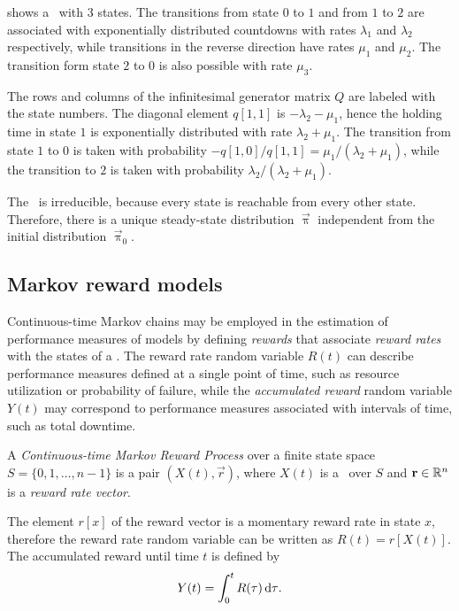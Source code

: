 \begin{example}
   shows a \CTMC\ with $3$
  states. The transitions from state $0$ to $1$ and from $1$ to $2$
  are associated with exponentially distributed countdowns with rates
  $\lambda_1$ and $\lambda_2$ respectively, while transitions in the
  reverse direction have rates $\mu_1$ and $\mu_2$. The transition
  form state $2$ to $0$ is also possible with rate $\mu_3$.
  
  The rows  and
  columns  of the infinitesimal generator
  matrix $Q$ are labeled with the state numbers. The diagonal element
  $q[1, 1]$ is $-\lambda_2 - \mu_1$, hence the holding time in state
  $1$ is exponentially distributed with rate $\lambda_2 + \mu_1$. The
  transition from state $1$ to $0$ is taken with probability
  $-q[1, 0] / q[1, 1] = \mu_1 / (\lambda_2 + \mu_1)$, while the
  transition to $2$ is taken with probability
  $\lambda_2 / (\lambda_2 + \mu_1)$.

  The \CTMC\ is irreducible, because every state is reachable from
  every other state. Therefore, there is a unique steady-state
  distribution $\vec{\uppi}$ independent from the initial distribution
  $\vec{\uppi}_0$.
\end{example}

\subsection{Markov reward models}

Continuous-time Markov chains may be employed in the estimation of
performance measures of models by defining \emph{rewards} that
associate \emph{reward rates} with the states of a \CTMC. The
reward rate random variable $R(t)$ can describe performance
measures defined at a single point of time, such as resource
utilization or probability of failure, while the \emph{accumulated
  reward} random variable $Y(t)$ may correspond to performance
measures associated with intervals of time, such as total downtime.

\begin{dfn}
  A \emph{Continuous-time Markov Reward Process} over a finite state
  space $S = \{0, 1, \ldots, n - 1\}$ is a pair $(X(t), \vec{r})$,
  where $X(t)$ is a \CTMC\ over $S$ and $\bm{\mathrm{r}} \in \mathbb{R}^n$ is a
  \emph{reward rate vector}.
\end{dfn}

The element $r[x]$ of the reward vector is a momentary reward rate in
state $x$, therefore the reward rate random variable can be written as
$R(t) = r[X(t)]$. The accumulated reward until time $t$ is defined by
\begin{equation}
  Y(t) = \int_{0}^t R(\tau) \, \mathrm{d} \tau \text.
\end{equation}


